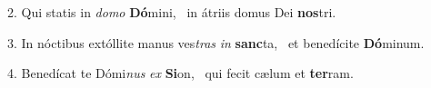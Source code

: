 2. Qui statis in \textit{do}\textit{mo} \textbf{Dó}mini, \ast\  in átriis domus Dei \textbf{nos}tri.\

3. In nóctibus extóllite manus ves\textit{tras} \textit{in} \textbf{sanc}ta, \ast\  et benedícite \textbf{Dó}minum.\

4. Benedícat te Dómi\textit{nus} \textit{ex} \textbf{Si}on, \ast\  qui fecit cælum et \textbf{ter}ram.\

